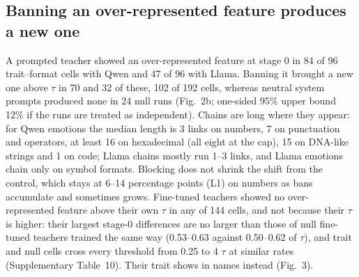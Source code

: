 \subsection{Banning an over-represented feature produces a new one}

A prompted teacher showed an over-represented feature at stage 0 in 84 of 96 trait--format cells with Qwen and 47 of 96 with Llama. Banning it brought a new one above $\tau$ in 70 and 32 of these, 102 of 192 cells, whereas neutral system prompts produced none in 24 null runs (Fig.~2b; one-sided 95\% upper bound 12\% if the runs are treated as independent). Chains are long where they appear: for Qwen emotions the median length is 3 links on numbers, 7 on punctuation and operators, at least 16 on hexadecimal (all eight at the cap), 15 on DNA-like strings and 1 on code; Llama chains mostly run 1--3 links, and Llama emotions chain only on symbol formats. Blocking does not shrink the shift from the control, which stays at 6--14 percentage points (L1) on numbers as bans accumulate and sometimes grows. Fine-tuned teachers showed no over-represented feature above their own $\tau$ in any of 144 cells, and not because their $\tau$ is higher: their largest stage-0 differences are no larger than those of null fine-tuned teachers trained the same way (0.53--0.63 against 0.50--0.62 of $\tau$), and trait and null cells cross every threshold from 0.25 to 4 $\tau$ at similar rates (Supplementary Table~10). Their trait shows in names instead (Fig.~3).


